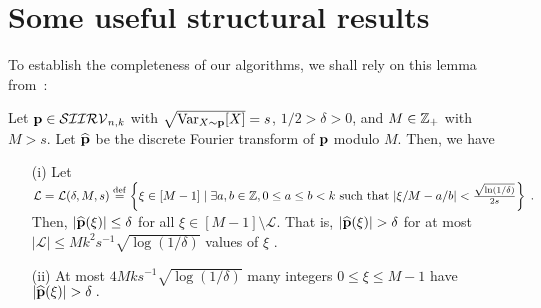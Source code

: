\section{Some useful structural results}\label{sec:learn}
To establish the completeness of our algorithms, we shall rely on this lemma from~\cite{DKS:15}:
\begin{lemma}\label{lemma:FourierSupportLem}
Let $\p \in \classksiirv[n]{k}$ with $\sqrt{\var_{X \sim \p}[X]} = s$, $1/2>\delta>0$, and $M \in \Z_+$ with $M>s$.
Let $\fourier{\p}$ be the discrete Fourier transform of $\p$ modulo $M$. Then, we have
  \begin{enumerate}
    \item[(i)]\label{lemma:FourierSupportLem:i} Let $\mathcal{L} = \mathcal{L}(\delta, M,s) \eqdef \left\{ \xi \in [M-1] \mid \exists a, b \in \Z, 0 \leq a \leq b < k \textrm{ such that }
    |\xi/M - a/b| <  \frac{\sqrt{\ln (1/\delta)}}{2s}  \right\} \;.$ Then, $|\fourier{\p}(\xi)| \leq \delta$ for all $\xi \in [M-1] \setminus \mathcal{L}.$
    That is, $|\fourier{\p}(\xi)| > \delta$ for
    at most $|\mathcal{L}| \leq M k^2 s^{-1} \sqrt{\log(1/\delta)}$ values of $\xi$ .
    \item[(ii)]\label{lemma:FourierSupportLem:ii} At most $4Mks^{-1}\sqrt{\log(1/\delta)}$ many integers $0 \leq \xi \leq M-1$ have  $|\fourier{\p}(\xi)| > \delta \;.$
  \end{enumerate}
\end{lemma}


